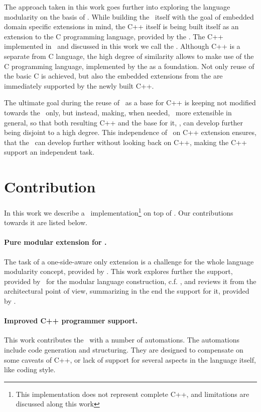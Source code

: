The approach taken in this work goes further into exploring the language modularity on the basis of \jbmps. While building 
the \cpppl\ itself  with the goal of embedded domain specific extensions in mind, the C++ itself is being built itself as 
an extension to the C programming language, provided by the . The C++ implemented in \jbmps\ and discussed in this 
work we call the \pcpp. Although C++ is a separate from C language, the high degree of similarity allows to make use of the C programming language,
implemented by the  as a foundation. Not only reuse of the basic C is achieved, but also the embedded extensions from
the  are immediately supported by the newly built C++.

The ultimate goal during the reuse of \mbdr\ as a base for C++ is keeping 
not modified towards the \cpppl\ only, but instead, making, when needed, \mbeddr\  more extensible in general, 
so that both resulting C++ and the base for it, \mbdr,  can develop further being disjoint to a high degree.
This independence of \mbdr\ on C++ extension ensures, that the \mbdp\ can develop further without looking back 
on C++, making the C++ support an independent task.

\section{Contribution}

In this work we describe a \cpppl\ implementation\footnote{This implementation does not represent complete C++, and
limitations are discussed along this work} on top of \mbdp. Our contributions towards it are listed below.


 \paragraph{Pure modular extension for \mbdr.} The task of a one-side-aware only extension is a challenge for the whole language modularity concept, 
provided by \jbmps. This work explores further the support, provided by \jbmps\ for the modular 
language construction, c.f. \cite{2012_ratiu_modular_dsls_and_analyses}, and reviews it from the architectural point of view,
summarizing in the end the support for it, provided by \jbmps.

 \paragraph{Improved C++ programmer support.} This work contributes the \cpppl\ with a number of automations. The automations include code 
generation and structuring. They are designed to compensate on some caveats of C++, or lack of support for 
several aspects in the language itself, like coding style. 

